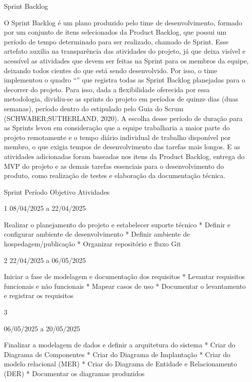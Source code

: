 Sprint Backlog


        O Sprint Backlog é um plano produzido pelo time de desenvolvimento, formado por um conjunto de itens selecionados da Product Backlog, que possui um período de tempo determinado para ser realizado, chamado de Sprint. Esse artefato auxilia na transparência das atividades do projeto, já que deixa visível e acessível as atividades que devem ser feitas na Sprint para os membros da equipe, deixando todos cientes do que está sendo desenvolvido. Por isso, o time implementou o quadro “” que registra todas as Sprint Backlog planejadas para o decorrer do projeto.
 Para isso,  dada a flexibilidade oferecida por essa metodologia, dividiu-se as sprints do projeto em períodos de quinze dias (duas semanas), período dentro do estipulado pelo Guia do Scrum (SCHWABER;SUTHERLAND, 2020). A escolha desse período de duração para as Sprints levou em consideração que a equipe trabalharia a maior parte do projeto remotamente e o tempo diário individual de trabalho disponível por membro, o que exigia tempos de desenvolvimento das tarefas mais longos. E as atividades adicionadas foram baseadas nos itens da Product Backlog, entrega do MVP do projeto e as demais tarefas essenciais para o desenvolvimento do produto, como realização de testes e elaboração da documentação técnica.




Sprint
	Período
	Objetivo
	Atividades
	



1
	08/04/2025 a 22/04/2025
	

Realizar o planejamento do projeto e estabelecer suporte técnico
	* Definir e configurar ambiente de desenvolvimento
* Definir ambiente de hospedagem/publicação
* Organizar repositório e fluxo Git
	





2
	22/04/2025 a 06/05/2025 
	

Iniciar a fase de modelagem e documentação dos requisitos
	* Levantar requisitos funcionais e não funcionais
* Mapear casos de uso
* Documentar o levantamento e registrar os requisitos
	







3
	

06/05/2025 a 20/05/2025 
	

Finalizar a modelagem de dados e definir a arquitetura do sistema
	* Criar do Diagrama de Componentes
* Criar do Diagrama de Implantação
* Criar do modelo relacional (MER)
* Criar do Diagrama de Entidade e Relacionamento (DER)
* Documentar os diagramas produzidos
	















